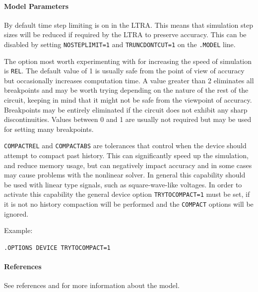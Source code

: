 %

\paragraph{Model Parameters}


By default time step limiting is on in the LTRA. This means that
simulation step sizes will be reduced if required by the LTRA to
preserve accuracy. This can be disabled by setting
\texttt{NOSTEPLIMIT=1} and \texttt{TRUNCDONTCUT=1} on the
\texttt{.MODEL} line.

The option most worth experimenting with for increasing the speed of
simulation is \texttt{REL}. The default value of 1 is usually safe
from the point of view of accuracy but occasionally increases
computation time. A value greater than 2 eliminates all breakpoints
and may be worth trying depending on the nature of the rest of the
circuit, keeping in mind that it might not be safe from the viewpoint
of accuracy. Breakpoints may be entirely eliminated if the circuit
does not exhibit any sharp discontinuities. Values between 0 and 1 are
usually not required but may be used for setting many breakpoints.

\texttt{COMPACTREL} and \texttt{COMPACTABS} are tolerances that
control when the device should attempt to compact past history. This
can significantly speed up the simulation, and reduce memory usage,
but can negatively impact accuracy and in some cases may cause
problems with the nonlinear solver. In general this capability should
be used with linear type signals, such as square-wave-like
voltages. In order to activate this capability the general device
option \texttt{TRYTOCOMPACT=1} must be set, if it is not no history
compaction will be performed and the \texttt{COMPACT} options will be
ignored.

Example:

\texttt{.OPTIONS DEVICE TRYTOCOMPACT=1}

\paragraph{References}
See references \cite{Roychodhury:1994} and \cite{Spice3f5-user-guide} for more information
about the model.
